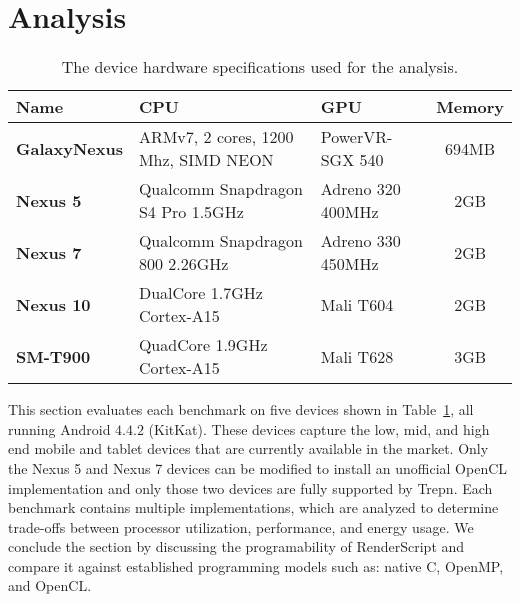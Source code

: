 \section{Analysis}
\label{sec:analysis}


\begin{table}
\centering
\begin{tabular}{ | l | p{2.1cm} | p{1.7cm} | c |}
    \hline 
    Name & CPU & GPU & Memory \\ \hline
    \textbf{GalaxyNexus} & ARMv7, 2 cores, 1200 Mhz, SIMD NEON & PowerVR-SGX 540 & 694MB \\ \hline
    \textbf{Nexus 5} & Qualcomm Snapdragon S4 Pro 1.5GHz & Adreno 320 400MHz & 2GB \\ \hline
    \textbf{Nexus 7} & Qualcomm Snapdragon 800 2.26GHz & Adreno 330 450MHz & 2GB \\ \hline
    \textbf{Nexus 10} & DualCore 1.7GHz Cortex-A15 & Mali T604 & 2GB \\ \hline
    \textbf{SM-T900} & QuadCore 1.9GHz Cortex-A15 & Mali T628 & 3GB \\ \hline
    \hline
\end{tabular}
\caption{The device hardware specifications used for the analysis.}
\label{table:hardware}
\end{table}

This section evaluates each benchmark on five devices shown
  in Table~\ref{table:hardware}, all running Android $4.4.2$ (KitKat).
These devices capture the low, mid, and high end mobile and tablet
  devices that are currently available in the market.
Only the Nexus 5 and Nexus 7 devices can be modified to install an
  unofficial OpenCL implementation and only those two devices are fully supported
  by Trepn.
Each benchmark contains multiple implementations, which 
  are analyzed to determine trade-offs between
  processor utilization, performance, and energy usage.
We conclude the section by discussing the programability of RenderScript
  and compare it against established programming models such as:
  native C, OpenMP, and OpenCL.







